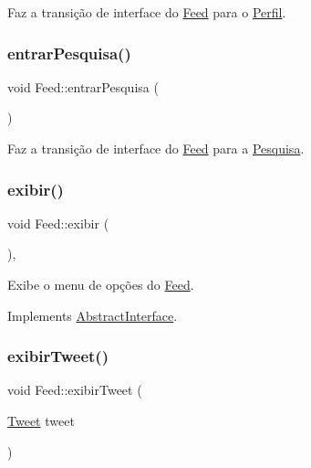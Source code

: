 Faz a transição de interface do \hyperlink{class_feed}{Feed} para o \hyperlink{class_perfil}{Perfil}. 

\mbox{\label{class_feed_a9b96760a159b09654b5d5ca04c306e03}} 
\subsubsection{\texorpdfstring{entrar\+Pesquisa()}{entrarPesquisa()}}
{\footnotesize\ttfamily void Feed\+::entrar\+Pesquisa (\begin{DoxyParamCaption}{ }\end{DoxyParamCaption})\hspace{0.3cm}{\ttfamily [private]}}



Faz a transição de interface do \hyperlink{class_feed}{Feed} para a \hyperlink{class_pesquisa}{Pesquisa}. 

\mbox{\label{class_feed_abc572553a07c93e0ff4c690b210d4c06}} 
\subsubsection{\texorpdfstring{exibir()}{exibir()}}
{\footnotesize\ttfamily void Feed\+::exibir (\begin{DoxyParamCaption}{ }\end{DoxyParamCaption})\hspace{0.3cm}{\ttfamily [override]}, {\ttfamily [virtual]}}



Exibe o menu de opções do \hyperlink{class_feed}{Feed}. 



Implements \hyperlink{class_abstract_interface_a1d5d2a15e6e640bd0190a835cb64e5ed}{Abstract\+Interface}.

\mbox{\label{class_feed_adafda05a2ddb99e160261e9728d84da0}} 
\subsubsection{\texorpdfstring{exibir\+Tweet()}{exibirTweet()}}
{\footnotesize\ttfamily void Feed\+::exibir\+Tweet (\begin{DoxyParamCaption}\item[{\hyperlink{class_tweet}{Tweet}}]{tweet }\end{DoxyParamCaption})\hspace{0.3cm}{\ttfamily [private]}}



